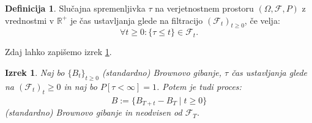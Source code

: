 \documentclass[11pt]{article}
\theoremstyle{definition}
\newtheorem{definicija}{Definicija}
\theoremstyle{plain}
\newtheorem{izrek}{Izrek}
\begin{document}
    \begin{definicija}
        Slučajna spremenljivka $\tau$ na verjetnostnem prostoru $(\Omega, \mathcal{F}, P)$ z vrednostmi v \(\mathbb{R}^+\) je čas ustavljanja glede na filtracijo $(\mathcal{F}_t)_{t \geq 0}$, če velja: 
        \[
        \forall t \geq 0 : \lbrace \tau \leq t \rbrace \in \mathcal{F}_t.
        \]
    \end{definicija}
    
    Zdaj lahko zapišemo izrek \ref{thm:stopped_brownian}. %
    
    \begin{izrek}
    \label{thm:stopped_brownian}  
    Naj bo $\{B_t\}_{t \geq 0}$ (standardno) Brownovo gibanje, $\tau$ čas ustavljanja glede na 
    $(\mathcal{F}_t)_t \geq 0$ in naj bo $P [\tau < \infty] = 1$.
    Potem je tudi proces:
    \[
    \hat{B} := \{B_{T+t} - B_T \mid t \geq 0\}
    \]
    (standardno) Brownovo gibanje in neodvisen od $\mathcal{F}_T$.
    \end{izrek} 
    
    
    
\end{document}
